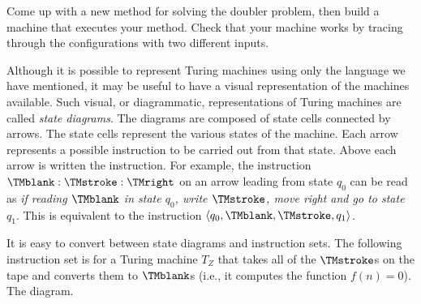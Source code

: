 \documentclass[../../include/open-logic-section]{subfiles}
\begin{document}
\begin{prob}
Come up with a new method for solving the doubler problem, then build
a machine that executes your method. Check that your machine works by
tracing through the configurations with two different inputs.
\end{prob}



\begin{explain}
Although it is possible to represent Turing machines using only the language we have mentioned, it may be useful to have a visual representation of the machines available. Such visual, or diagrammatic, representations of Turing machines are called \emph{state diagrams}. The diagrams are composed of state cells connected by arrows. The state cells represent the various states of the machine. Each arrow represents a possible instruction to be carried out from that state. Above each arrow is written the instruction. For example, the instruction $\TMblank :\TMstroke :\TMright$ on an arrow leading from state $q_0$ can be read as \emph{if reading $\TMblank$ in state $q_0$, write $\TMstroke$, move right and go to state $q_1$}. This is equivalent to the instruction $\tuple{q_0, \TMblank, \TMstroke, q_1}$.

It is easy to convert between state diagrams and instruction sets. The following instruction set is for a Turing machine $T_Z$ that takes all of the $\TMstroke$s on the tape and converts them to $\TMblank$s (i.e., it computes the function  $f(n) = 0$). The diagram. 


\end{explain}
\end{document}

